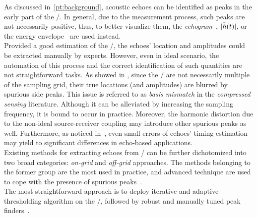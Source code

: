 As discussed in~\cref{pt:background}, acoustic echoes can be identified as peaks in the early part of the \RIR/.
In general, due to the measurement process, such peaks are not necessarily positive, thus, to better visualize them, the \textit{echogram}~, $|{\tilde{h}(t)}|$, or the energy envelope~ are used instead.
\\Provided a good estimation of the \RIRs/, the echoes' location and amplitudes could be extracted manually by experts.
However, even in ideal scenario, the automation of this process and the correct identification of such quantities are not straightforward tasks.
As showed in , since the \TOAs/ are not necessarily multiple of the sampling grid, their true locations (and amplitudes) are blurred by spurious side peaks.
This issue is referred to as \textit{basis mismatch} in the \textit{compressed sensing} literature.
Although it can be alleviated by increasing the sampling frequency, it is bound to occur in practice.
Moreover, the harmonic distortion due to the non-ideal source-receiver coupling may introduce other spurious peaks as well.
Furthermore, as noticed in~, even small errors of echoes' timing estimation may yield to significant differences in echo-based applications.
\\Existing methods for extracting echoes from \RIRs/ can be further dichotomized into two broad categories: \textit{on-grid} and \textit{off-grid} approaches.
The methods belonging to the former group are the most used in practice, and advanced technique are used to cope with the presence of spurious peaks~.
\\The most straightforward approach is to deploy iterative and adaptive thresholding algorithm on the \RIR/, followed by robust and manually tuned peak finders~.
